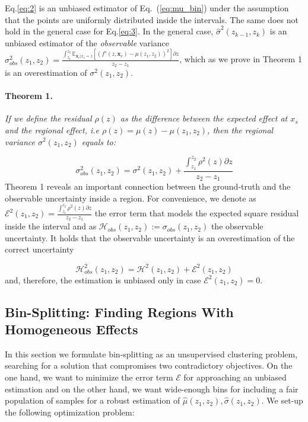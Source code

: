 \documentclass[twoside]{article}
\newcommand{\xc}{\mathbf{x}_c}
\begin{document}
Eq.\eqref{eq:2} is an unbiased estimator of Eq.~(\ref{eq:mu_bin})
under the assumption that the points are uniformly distributed inside
the intervals. The same does not hold in the general case for
Eq.\eqref{eq:3}. In the general case, \(\hat{\sigma}^2(z_{k-1}, z_k)\)
is an unbiased estimator of the \textit{observable} variance
\(\sigma^2_{obs}(z_1, z_2) = \frac{\int_{z_1}^{z_2}
    \mathbb{E}_{\xc|x_s=z} \left [ (f^s(z, \xc) - \mu(z_1, z_2) )^2
    \right] \partial z}{z_2 - z_1}\), which as we prove in Theorem 1
is an overestimation of \(\sigma^2(z_1, z_2)\).

\paragraph{Theorem 1.}
\label{sec:theorem-1}

\textit{If we define the residual \(\rho(z)\) as the difference
  between the expected effect at \(x_s\) and the regional effect, i.e
  \(\rho(z) = \mu(z) - \mu(z_1, z_2)\), then the regional variance
  \(\sigma^2(z_1, z_2)\) equals to:}

\begin{equation}
    \label{eq:bin-uncertainty-proof}
 \sigma_{obs}^2(z_1, z_2) = \sigma^2(z_1, z_2) + \frac{\int_{z_1}^{z_2}\rho^2(z) \partial z}{z_2 - z_1}
\end{equation}
\noindent
Theorem 1 reveals an important connection between the ground-truth and
the observable uncertainty inside a region. For convenience, we denote
as
\(\mathcal{E}^2(z_1, z_2) = \frac{\int_{z_1}^{z_2}\rho^2(z) \partial
  z}{z_2 - z_1}\) the error term that models the expected square
residual inside the interval and as
\(\mathcal{H}_{obs}(z_1, z_2) := \sigma_{obs}(z_1, z_2)\) the
observable uncertainty. It holds that the observable uncertainty is an
overestimation of the correct uncertainty

\begin{equation}
  \label{eq:uncertainty-bin}
  \mathcal{H}^2_{obs}(z_1, z_2) = \mathcal{H}^2(z_1, z_2) + \mathcal{E}^2(z_1, z_2)
\end{equation}
%
and, therefore, the estimation is unbiased only in case
\(\mathcal{E}^2(z_1, z_2) = 0\).

\subsection{Bin-Splitting: Finding Regions With Homogeneous Effects}
\label{sec:bin-spliting}

In this section we formulate bin-splitting as an unsupervised
clustering problem, searching for a solution that compromises two
contradictory objectives. On the one hand, we want to minimize the
error term \(\mathcal{E}\) for approaching an unbiased estimation and
on the other hand, we want wide-enough bins for including a fair
population of samples for a robust estimation of
\(\hat{\mu}(z_1, z_2), \hat{\sigma}(z_1, z_2)\). We set-up the
following optimization problem:
\end{document}
